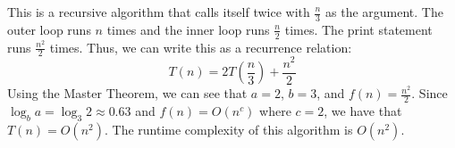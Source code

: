 \documentclass[12pt]{exam}
\begin{document}
\begin{solution}
	This is a recursive algorithm that calls itself twice with $\frac{n}{3}$ as the argument.
	The outer loop runs $n$ times and the inner loop runs $\frac{n}{2}$ times.
	The print statement runs $\frac{n^2}{2}$ times.
	Thus, we can write this as a recurrence relation:
	\[T(n) = 2T\left(\frac{n}{3}\right) + \frac{n^2}{2}\]
	Using the Master Theorem, we can see that $a = 2$, $b = 3$, and $f(n) = \frac{n^2}{2}$.
	Since $\log_b a = \log_3 2 \approx 0.63$ and $f(n) = O(n^c)$ where $c = 2$, we have that $T(n) = O(n^2)$.
	The runtime complexity of this algorithm is $O(n^2)$.
\end{solution}
\end{document}
